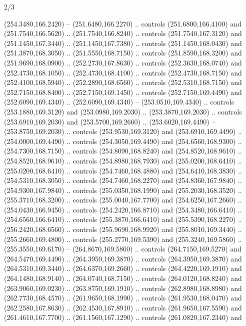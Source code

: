 \begin{flagdescription}{2/3}
\begin{scope}[xshift=0.5\flaglength,yshift=0.5\flagwidth,scale=\flagwidth/259.2]
\begin{scope}[y=0.8pt, x=0.8pt, yscale=-1,shift={(-243,-162)}]
      (254.3480,166.2420) -- (251.6480,166.2270) .. controls (251.6800,166.4100) and
      (251.7540,166.5620) .. (251.7540,166.8240) .. controls (251.7540,167.3120) and
      (251.1450,167.3440) .. (251.1450,167.7380) .. controls (251.1450,168.0430) and
      (251.3870,168.3050) .. (251.5550,168.7150) .. controls (251.8590,168.3200) and
      (251.9690,168.0900) .. (252.2730,167.8630) .. controls (252.3630,168.0740) and
      (252.4730,168.1050) .. (252.4730,168.4100) .. controls (252.4730,168.7150) and
      (252.4100,168.5940) .. (252.2890,168.6560) .. controls (252.5310,168.7150) and
      (252.7150,168.8400) .. (252.7150,169.1450) .. controls (252.7150,169.4490) and
      (252.6090,169.4340) .. (252.6090,169.4340) -- (253.0510,169.4340) .. controls
      (253.1880,169.3120) and (253.0980,169.2030) .. (253.3870,169.2030) .. controls
      (253.6910,169.2030) and (253.5700,169.2660) .. (253.6020,169.4490) --
      (253.8750,169.2030) .. controls (253.9530,169.3120) and (253.6910,169.4490) ..
      (254.0000,169.4490) .. controls (254.3050,169.4490) and (254.6560,168.9300) ..
      (254.7300,168.7150) .. controls (254.8090,168.8240) and (254.8520,168.9610) ..
      (254.8520,168.9610) .. controls (254.8980,168.7930) and (255.0200,168.6410) ..
      (255.0200,168.6410) .. controls (254.7460,168.4880) and (254.6410,168.3830) ..
      (254.5310,168.3050) .. controls (254.7460,168.2270) and (254.8360,167.9840) ..
      (254.9300,167.9840) .. controls (255.0350,168.1990) and (255.2030,168.3520) ..
      (255.3710,168.3200) .. controls (255.0040,167.7700) and (254.6250,167.2660) ..
      (254.0430,166.9450) .. controls (254.2420,166.8710) and (254.3480,166.6410) ..
      (254.6560,166.6410) .. controls (255.3870,166.6410) and (255.5390,168.2270) ..
      (256.2420,168.6560) .. controls (255.9690,168.9920) and (255.8010,169.3440) ..
      (255.2660,169.4800) .. controls (255.2770,169.5390) and (255.3240,169.5860) ..
      (255.3550,169.6170) -- (264.8670,169.5860) .. controls (264.7150,169.5270) and
      (264.5470,169.4490) .. (264.3950,169.3870) .. controls (264.3950,169.3870) and
      (264.5310,169.3440) .. (264.6370,169.2660) .. controls (264.4220,169.1910) and
      (264.1480,168.9140) .. (264.0740,168.7150) .. controls (264.0120,168.8240) and
      (263.9060,169.0230) .. (263.8750,169.1910) .. controls (262.8980,168.8980) and
      (262.7730,168.4570) .. (261.9650,168.1990) .. controls (261.9530,168.0470) and
      (262.2580,167.8630) .. (262.4530,167.8910) .. controls (261.9650,167.5590) and
      (261.4610,167.7700) .. (261.1560,167.1290) .. controls (261.0820,167.2340) and

\end{scope}
\end{scope}
\end{flagdescription}
